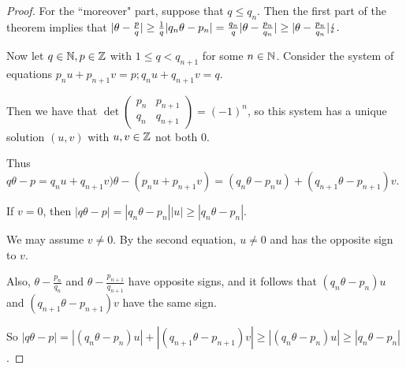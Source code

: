 \documentclass[10pt,a4paper]{article}
\begin{document}
\begin{proof}
For the ``moreover" part, suppose that $q \leq q_n$. Then the first part of the theorem implies that $|\theta - \frac{p}{q}| \geq \frac{1}{q}|q_n\theta - p_n| = \frac{q_n}{q}|\theta-\frac{p_n}{q_n}| \geq | \theta - \frac{p_n}{q_n}| \lightning.$

Now let $q \in \mathbb{N}, p \in \mathbb{Z}$ with $1\leq q < q_{n+1}$ for some $n \in \mathbb{N}$. Consider the system of equations $p_nu + p_{n+1}v = p; q_n u + q_{n+1} v = q$.

Then we have that $\det \begin{pmatrix} p_n & p_{n+1} \\ q_n & q_{n+1} \end{pmatrix} = (-1)^n$, so this system has a unique solution $(u,v)$ with $u,v \in \mathbb{Z}$ not both 0.

Thus $q \theta -p = q_n u + q_{n+1} v)\theta - (p_n u + p_{n+1}v) = (q_n \theta - p_nu) + (q_{n+1}\theta - p_{n+1})v$.

If $v = 0$, then $|q\theta - p| = |q_n \theta - p_n||u| \geq |q_n\theta - p_n|$.

We may assume $v \neq 0$. By the second equation, $u \neq 0$ and has the opposite sign to $v$.

Also, $\theta - \frac{p_n}{q_n}$ and $\theta -\frac{p_{n+1}}{q_{n+1}}$ have opposite signs, and it follows that $(q_n \theta - p_n)u$ and $(q_{n+1}\theta-p_{n+1})v$ have the same sign.

So $|q\theta-p| = |(q_n\theta-p_n)u| + |(q_{n+1}\theta-p_{n+1})v| \geq |(q_n\theta-p_n)u| \geq |q_n\theta - p_n|$.
\end{proof}
\end{document}

